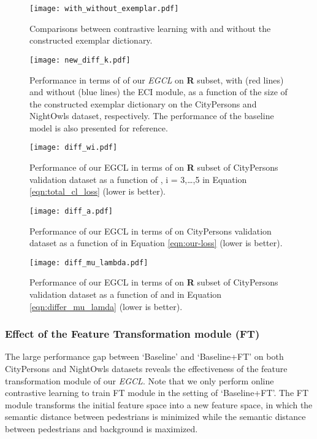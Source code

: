 \documentclass[journal]{IEEEtran}
\begin{document}
\begin{figure}[t]
\centering
    \texttt{[image: with\_without\_exemplar.pdf]}
\caption{Comparisons between contrastive learning with and without the constructed exemplar dictionary.}
\label{Fig:with_without_exemplars}
\end{figure}
\begin{figure}[t]
\centering
    \texttt{[image: new\_diff\_k.pdf]}
\caption{Performance in terms of  of our \emph{EGCL} on \textbf{R} subset, with (red lines) and without (blue lines) the ECI module, as a function of the size of the constructed exemplar dictionary  on the CityPersons and NightOwls dataset, respectively. The performance of the baseline model is also presented for reference.}
\label{Fig:diff_k}
\end{figure}


\begin{figure}[t]
\centering
    \texttt{[image: diff\_wi.pdf]}
\caption{Performance of our EGCL in terms of  on \textbf{R} subset of CityPersons validation dataset as a function of , i = 3,\dots,5 in Equation \ref{eqn:total_cl_loss} (lower is better).}
\label{Fig:diff_wi}
\end{figure}

\begin{figure}[t]
\centering
    \texttt{[image: diff\_a.pdf]}
\caption{
    Performance of our EGCL in terms of  on CityPersons validation dataset as a function of  in Equation \ref{eqn:our-loss} (lower is better).} 
\label{Fig:diff_alpha}
\end{figure}
\begin{figure}[t]
\centering
    \texttt{[image: diff\_mu\_lambda.pdf]}
\caption{Performance of our EGCL in terms of  on \textbf{R} subset of CityPersons validation dataset as a function of   and  in Equation \ref{eqn:differ_mu_lamda} (lower is better).} 
\label{Fig:diff_mu_lambda}
\end{figure}



\subsubsection{Effect of the Feature Transformation module (FT)}
The large performance gap between `Baseline' and `Baseline+FT' on both CityPersons and NightOwls datasets reveals the effectiveness of the feature transformation module of our \emph{EGCL}. Note that we only perform online contrastive learning to train FT module in the setting of `Baseline+FT'. The FT module transforms the initial feature space into a new feature space, in which the semantic distance between pedestrians is minimized while the semantic distance between pedestrians and background is maximized. 
\end{document}
